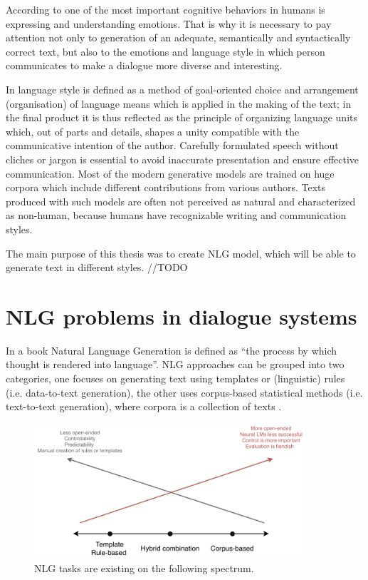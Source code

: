According to \cite{salovey1990emotional} one of the most important cognitive behaviors in humans is expressing and understanding emotions. That is why it is necessary to pay attention not only to generation of an adequate, semantically and syntactically correct text, but also to the emotions and language style in which person communicates to make a dialogue more diverse and interesting. 

In \cite{minavrova2003souvcasna} language style is defined as a method of goal-oriented choice and arrangement (organisation) of language means which is applied in the making of the text; in the final product it is thus reflected as the principle of organizing language units which, out of parts and details, shapes a unity compatible with the communicative intention of the author. Carefully formulated speech without cliches or jargon is essential to avoid inaccurate presentation and ensure effective communication. Most of the modern generative models are trained on huge corpora which include different contributions from various authors. Texts produced with such models are often not perceived as natural and characterized as non-human, because humans have recognizable writing and communication styles.


The main purpose of this thesis was to create NLG model, which will be able to generate text in different styles.  //TODO


\chapter{NLG problems in dialogue systems}\label{nlg_problems}
In a book \cite{alder2017handbook} Natural Language Generation is defined as ``the process by which thought is rendered into language''. NLG approaches can be grouped into two categories, one focuses on generating text using templates or (linguistic) rules (i.e. data-to-text generation), the other uses corpus-based statistical methods (i.e. text-to-text generation), where corpora is a collection of texts \cite{oh2002stochastic}.


\begin{figure}[hbt]
  \centering
  \includegraphics[width=0.9\textwidth]{figures/templateVScorpus.pdf}
  \caption{NLG tasks are existing on the following spectrum.}
  \label{nlg_spectum}
\end{figure}

